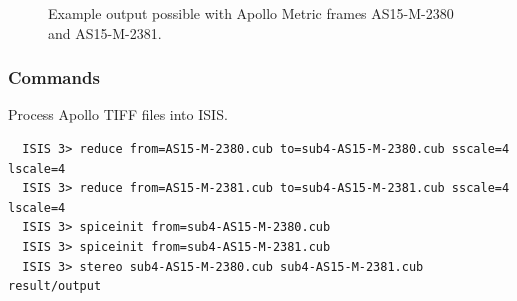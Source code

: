 \begin{figure}[h!]
\centering
  \hfil
\caption{Example output possible with Apollo Metric frames AS15-M-2380 and AS15-M-2381.}
\label{fig:metric_example}
\end{figure}

\pagebreak

\subsubsection*{Commands}

Process Apollo TIFF files into \ac{ISIS}.
\begin{verbatim}
  ISIS 3> reduce from=AS15-M-2380.cub to=sub4-AS15-M-2380.cub sscale=4 lscale=4
  ISIS 3> reduce from=AS15-M-2381.cub to=sub4-AS15-M-2381.cub sscale=4 lscale=4
  ISIS 3> spiceinit from=sub4-AS15-M-2380.cub
  ISIS 3> spiceinit from=sub4-AS15-M-2381.cub
  ISIS 3> stereo sub4-AS15-M-2380.cub sub4-AS15-M-2381.cub result/output
\end{verbatim}

